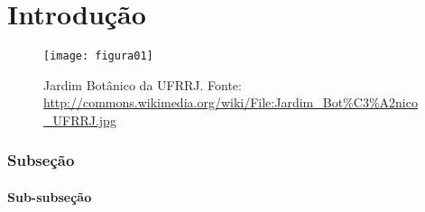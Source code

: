 \setcounter{page}{1}
\artigofalse
\chapter{Introdução}
\label{chap:introduction}

\blindtext[2]

\begin{figure}[!ht]
\centering
\texttt{[image: figura01]}
\caption{Jardim Botânico da UFRRJ. Fonte: \url{http://commons.wikimedia.org/wiki/File:Jardim_Bot\%C3\%A2nico_UFRRJ.jpg}}
\label{fig:jardim}
\end{figure}

\blindtext[1]

\subsection{Subseção}

\blindtext[2]

\subsubsection{Sub-subseção}

\blindtext[2]